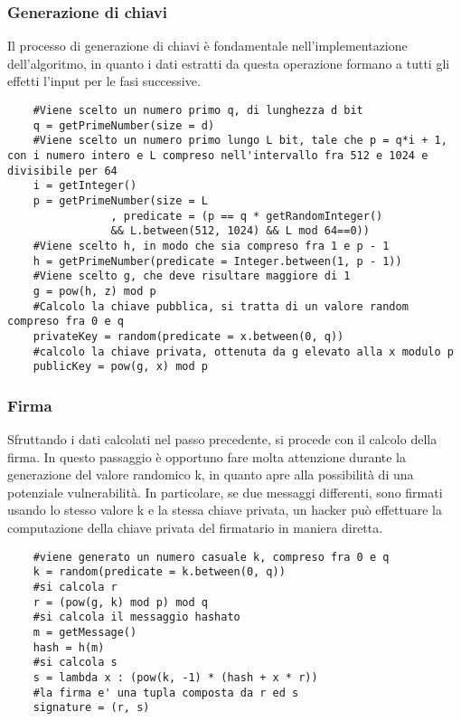\subsubsection{Generazione di chiavi}

Il processo di generazione di chiavi è fondamentale nell'implementazione dell'algoritmo, in quanto i dati estratti da questa operazione formano a tutti gli effetti l'input per le fasi successive. 

\begin{lstlisting}
	#Viene scelto un numero primo q, di lunghezza d bit
	q = getPrimeNumber(size = d)
	#Viene scelto un numero primo lungo L bit, tale che p = q*i + 1, con i numero intero e L compreso nell'intervallo fra 512 e 1024 e divisibile per 64
	i = getInteger()
	p = getPrimeNumber(size = L
				, predicate = (p == q * getRandomInteger() 
				&& L.between(512, 1024) && L mod 64==0))
	#Viene scelto h, in modo che sia compreso fra 1 e p - 1
	h = getPrimeNumber(predicate = Integer.between(1, p - 1))
	#Viene scelto g, che deve risultare maggiore di 1
	g = pow(h, z) mod p 
	#Calcolo la chiave pubblica, si tratta di un valore random compreso fra 0 e q
	privateKey = random(predicate = x.between(0, q))
	#calcolo la chiave privata, ottenuta da g elevato alla x modulo p
	publicKey = pow(g, x) mod p
\end{lstlisting}

\subsubsection{Firma}

Sfruttando i dati calcolati nel passo precedente, si procede con il calcolo della firma. In questo passaggio è opportuno fare molta attenzione durante la generazione del valore randomico k, in quanto apre alla possibilità di una potenziale vulnerabilità.
In particolare, se due messaggi differenti, sono firmati usando lo stesso valore k e la stessa chiave privata, un hacker può effettuare la computazione della chiave privata del firmatario in maniera diretta.

\begin{lstlisting}
	#viene generato un numero casuale k, compreso fra 0 e q
	k = random(predicate = k.between(0, q))
	#si calcola r
	r = (pow(g, k) mod p) mod q
	#si calcola il messaggio hashato
	m = getMessage()
	hash = h(m)
	#si calcola s
	s = lambda x : (pow(k, -1) * (hash + x * r))
	#la firma e' una tupla composta da r ed s
	signature = (r, s)
\end{lstlisting}

